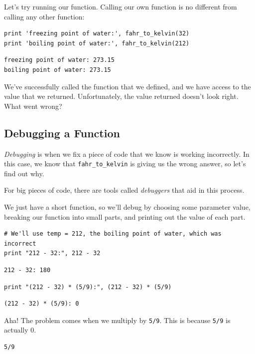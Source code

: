 \documentclass{book}
\begin{document}
Let's try running our function. Calling our own function is no different
from calling any other function:

\begin{verbatim}
print 'freezing point of water:', fahr_to_kelvin(32)
print 'boiling point of water:', fahr_to_kelvin(212)
\end{verbatim}

\begin{verbatim}
freezing point of water: 273.15
boiling point of water: 273.15
\end{verbatim}

We've successfully called the function that we defined, and we have
access to the value that we returned. Unfortunately, the value returned
doesn't look right. What went wrong?

\subsection{Debugging a Function}

\emph{Debugging} is when we fix a piece of code that we know is working
incorrectly. In this case, we know that \texttt{fahr\_to\_kelvin} is
giving us the wrong answer, so let's find out why.

For big pieces of code, there are tools called \emph{debuggers} that aid
in this process.

We just have a short function, so we'll debug by choosing some parameter
value, breaking our function into small parts, and printing out the
value of each part.

\begin{verbatim}
# We'll use temp = 212, the boiling point of water, which was incorrect
print "212 - 32:", 212 - 32
\end{verbatim}

\begin{verbatim}
212 - 32: 180
\end{verbatim}

\begin{verbatim}
print "(212 - 32) * (5/9):", (212 - 32) * (5/9)
\end{verbatim}

\begin{verbatim}
(212 - 32) * (5/9): 0
\end{verbatim}

Aha! The problem comes when we multiply by \texttt{5/9}. This is because
\texttt{5/9} is actually 0.

\begin{verbatim}
5/9
\end{verbatim}
\end{document}
